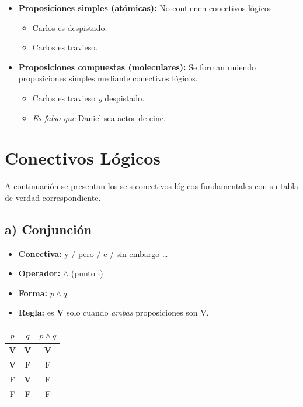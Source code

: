 \documentclass[12pt,a4paper]{article}
\newcommand{\TV}[1]{\textbf{#1}}   %
\begin{document}
\begin{itemize}[leftmargin=1.5cm]
  \item \textbf{Proposiciones simples (atómicas):} No contienen conectivos lógicos.
        \begin{itemize}
          \item Carlos es despistado.
          \item Carlos es travieso.
        \end{itemize}
  \item \textbf{Proposiciones compuestas (moleculares):} Se forman uniendo proposiciones
        simples mediante conectivos lógicos.
        \begin{itemize}
          \item Carlos es travieso \textit{y} despistado.
          \item \textit{Es falso que} Daniel sea actor de cine.
        \end{itemize}
\end{itemize}

\section{Conectivos Lógicos}

A continuación se presentan los seis conectivos lógicos fundamentales con su
tabla de verdad correspondiente.

\subsection{a) Conjunción}

\begin{minipage}{0.55\linewidth}
\begin{itemize}[leftmargin=*]
  \item \textbf{Conectiva:} y / pero / e / sin embargo \ldots
  \item \textbf{Operador:} $\wedge$ (punto $\cdot$)
  \item \textbf{Forma:} $p \wedge q$
  \item \textbf{Regla:} es \textbf{V} solo cuando \emph{ambas} proposiciones son V.
\end{itemize}
\end{minipage}%
\hfill
\begin{minipage}{0.38\linewidth}
\centering
\begin{tabular}{cc|c}
\toprule
$p$ & $q$ & $p \wedge q$ \\
\midrule
\TV{V} & \TV{V} & \TV{V} \\
\TV{V} & F      & F      \\
F      & \TV{V} & F      \\
F      & F      & F      \\
\bottomrule
\end{tabular}
\end{minipage}
\end{document}
